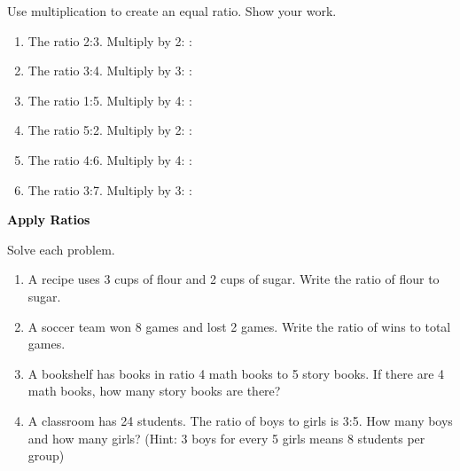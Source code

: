 \documentclass[12pt, letterpaper, fleqn]{article}
\newcommand{\blank}{\underline{\hspace{2.2cm}}}
\begin{document}
\noindent
Use multiplication to create an equal ratio. Show your work.

\vspace{3mm}

\begin{enumerate}[itemsep=2cm, leftmargin=0.6cm]

\item The ratio 2:3. Multiply by 2: \blank : \blank

\item The ratio 3:4. Multiply by 3: \blank : \blank

\item The ratio 1:5. Multiply by 4: \blank : \blank

\item The ratio 5:2. Multiply by 2: \blank : \blank

\item The ratio 4:6. Multiply by 4: \blank : \blank

\item The ratio 3:7. Multiply by 3: \blank : \blank

\end{enumerate}

\newpage

\begin{tcolorbox}[colback=customteal!20]
\large\textcolor{black}{\textbf{Apply Ratios}}
\end{tcolorbox}

\noindent
Solve each problem.

\vspace{3mm}

\begin{enumerate}[itemsep=1.8cm, leftmargin=0.6cm]

\item A recipe uses 3 cups of flour and 2 cups of sugar. Write the ratio of flour to sugar.

\vspace{1.2cm}

\item A soccer team won 8 games and lost 2 games. Write the ratio of wins to total games.

\vspace{1.2cm}

\item A bookshelf has books in ratio 4 math books to 5 story books. If there are 4 math books, how many story books are there?

\vspace{1.2cm}

\item A classroom has 24 students. The ratio of boys to girls is 3:5. How many boys and how many girls? (Hint: 3 boys for every 5 girls means 8 students per group)

\vspace{1.5cm}

\end{enumerate}
\end{document}
